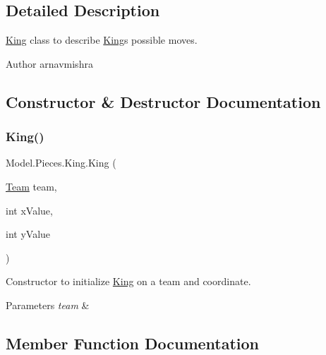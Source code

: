 \subsection{Detailed Description}
\hyperlink{class_model_1_1_pieces_1_1_king}{King} class to describe \hyperlink{class_model_1_1_pieces_1_1_king}{King}\textquotesingle{}s possible moves. \begin{DoxyAuthor}{Author}
arnavmishra 
\end{DoxyAuthor}


\subsection{Constructor \& Destructor Documentation}
\hypertarget{class_model_1_1_pieces_1_1_king_a064e3c2161d2fc9153efb4618493550e}{}\label{class_model_1_1_pieces_1_1_king_a064e3c2161d2fc9153efb4618493550e} 
\subsubsection{\texorpdfstring{King()}{King()}}
{\footnotesize\ttfamily Model.\+Pieces.\+King.\+King (\begin{DoxyParamCaption}\item[{\hyperlink{class_model_1_1_team}{Team}}]{team,  }\item[{int}]{x\+Value,  }\item[{int}]{y\+Value }\end{DoxyParamCaption})}

Constructor to initialize \hyperlink{class_model_1_1_pieces_1_1_king}{King} on a team and coordinate. 
\begin{DoxyParams}{Parameters}
{\em team} & \\
\hline
\end{DoxyParams}


\subsection{Member Function Documentation}
\hypertarget{class_model_1_1_pieces_1_1_king_a4d77bfe79a1c8087c8ce91397388c6d5}{}\label{class_model_1_1_pieces_1_1_king_a4d77bfe79a1c8087c8ce91397388c6d5} 
